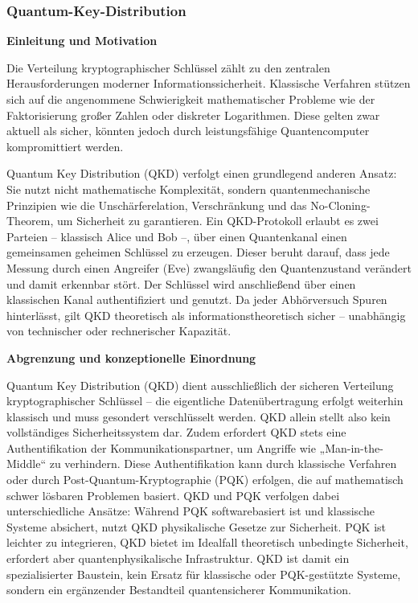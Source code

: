 \subsubsection{Quantum-Key-Distribution}
\noindent\textbf{Einleitung und Motivation}

\noindent
Die Verteilung kryptographischer Schlüssel zählt zu den zentralen Herausforderungen moderner Informationssicherheit. Klassische Verfahren stützen sich auf die angenommene Schwierigkeit mathematischer Probleme wie der Faktorisierung großer Zahlen oder diskreter Logarithmen. Diese gelten zwar aktuell als sicher, könnten jedoch durch leistungsfähige Quantencomputer kompromittiert werden.

\noindent
Quantum Key Distribution (QKD) verfolgt einen grundlegend anderen Ansatz: Sie nutzt nicht mathematische Komplexität, sondern quantenmechanische Prinzipien wie die Unschärferelation, Verschränkung und das No-Cloning-Theorem, um Sicherheit zu garantieren. \cite{scarani_et_al_security_2009}
Ein QKD-Protokoll erlaubt es zwei Parteien – klassisch Alice und Bob –, über einen Quantenkanal einen gemeinsamen geheimen Schlüssel zu erzeugen. Dieser beruht darauf, dass jede Messung durch einen Angreifer (Eve) zwangsläufig den Quantenzustand verändert und damit erkennbar stört. \cite{bennett_et_al_quantum_1984}
Der Schlüssel wird anschließend über einen klassischen Kanal authentifiziert und genutzt. Da jeder Abhörversuch Spuren hinterlässt, gilt QKD theoretisch als informationstheoretisch sicher – unabhängig von technischer oder rechnerischer Kapazität. \cite{ekert_et_al_quantum_1991}


\vspace{1em}
\noindent\textbf{Abgrenzung und konzeptionelle Einordnung}

\noindent
Quantum Key Distribution (QKD) dient ausschließlich der sicheren Verteilung kryptographischer Schlüssel – die eigentliche Datenübertragung erfolgt weiterhin klassisch und muss gesondert verschlüsselt werden. QKD allein stellt also kein vollständiges Sicherheitssystem dar. \cite{scarani_et_al_security_2009}
Zudem erfordert QKD stets eine Authentifikation der Kommunikationspartner, um Angriffe wie „Man-in-the-Middle“ zu verhindern. Diese Authentifikation kann durch klassische Verfahren oder durch Post-Quantum-Kryptographie (PQK) erfolgen, die auf mathematisch schwer lösbaren Problemen basiert. \cite{mosca_et_al_cybersecurity_2018}
QKD und PQK verfolgen dabei unterschiedliche Ansätze: Während PQK softwarebasiert ist und klassische Systeme absichert, nutzt QKD physikalische Gesetze zur Sicherheit. PQK ist leichter zu integrieren, QKD bietet im Idealfall theoretisch unbedingte Sicherheit, erfordert aber quantenphysikalische Infrastruktur. \cite{national_academies_of_sciences_quantum_2019}
QKD ist damit ein spezialisierter Baustein, kein Ersatz für klassische oder PQK-gestützte Systeme, sondern ein ergänzender Bestandteil quantensicherer Kommunikation.


